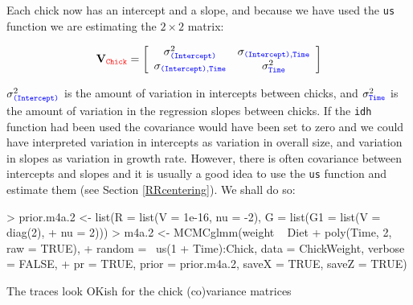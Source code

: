 \documentclass{article}
\begin{document}
Each chick now has an intercept and a slope, and because we have used the \texttt{us} function we are estimating the $2\times2$ matrix:

\begin{displaymath}
{\bf V}_{{\color{red} \texttt{Chick}}}=
\left[
\begin{array}{cc}
\sigma^{2}_{\color{blue}\texttt{(Intercept)}}&\sigma_{\color{blue}\texttt{(Intercept)}, \texttt{Time}}\\
\sigma_{\color{blue}\texttt{(Intercept)}, \texttt{Time}}&\sigma^{2}_{\color{blue} \texttt{Time}}\\
\end{array}
\right]
\end{displaymath}

$\sigma^{2}_{\color{blue}\texttt{(Intercept)}}$ is the amount of variation in intercepts between chicks, and $\sigma^{2}_{\color{blue}\texttt{Time}}$ is the amount of variation in the regression slopes between chicks. If the \texttt{idh} function had been used the covariance would have been set to zero and we could have interpreted variation in intercepts as variation in overall size, and variation in slopes as variation in growth rate.  However, there is often covariance between intercepts and slopes and it is usually a good idea to use the \texttt{us} function and estimate them (see Section \ref{RRcentering}). We shall do so: 

\begin{Schunk}
\begin{Sinput}
> prior.m4a.2 <- list(R = list(V = 1e-16, nu = -2), G = list(G1 = list(V = diag(2), 
+     nu = 2)))
> m4a.2 <- MCMCglmm(weight ~ Diet + poly(Time, 2, raw = TRUE), 
+     random = ~us(1 + Time):Chick, data = ChickWeight, verbose = FALSE, 
+     pr = TRUE, prior = prior.m4a.2, saveX = TRUE, saveZ = TRUE)
\end{Sinput}
\end{Schunk}

The traces look OKish for the chick (co)variance matrices
\end{document}
